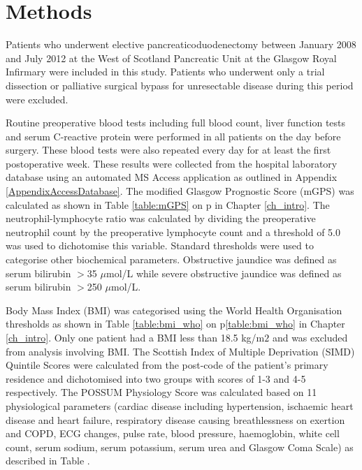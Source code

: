 

\section{Methods}
Patients who underwent elective pancreaticoduodenectomy between January 2008 and July 2012 at the West of Scotland Pancreatic Unit at the Glasgow Royal Infirmary were included in this study. 
Patients who underwent only a trial dissection or palliative surgical bypass for unresectable disease during this period were excluded.

Routine preoperative blood tests including full blood count, liver function tests and serum C-reactive protein were performed in all patients on the day before surgery. 
These blood tests were also repeated every day for at least the first postoperative week. 
These results were collected from the hospital laboratory database using an automated MS Access application as outlined in Appendix \ref{AppendixAccessDatabase}. 
The modified Glasgow Prognostic Score (mGPS) was calculated as shown in Table \ref{table:mGPS} on p\pageref{table:mGPS} in Chapter \ref{ch_intro}. 
The neutrophil-lymphocyte ratio was calculated by dividing the preoperative neutrophil count by the preoperative lymphocyte count and a threshold of 5.0 was used to dichotomise this variable. 
Standard thresholds were used to categorise other biochemical parameters. 
Obstructive jaundice was defined as serum bilirubin $>$35 $\mu$mol/L while severe obstructive jaundice was defined as serum bilirubin $>$250 $\mu$mol/L. 

Body Mass Index (BMI) was categorised using the World Health Organisation thresholds as shown in Table \ref{table:bmi_who} on p\ref{table:bmi_who} in Chapter \ref{ch_intro}. 
Only one patient had a BMI less than 18.5 kg/m$2$ and was excluded from analysis involving BMI.
The Scottish Index of Multiple Deprivation (SIMD) Quintile Scores were calculated from the post-code of the patient's primary residence and dichotomised into two groups with scores of 1-3 and 4-5 respectively.
The POSSUM Physiology Score was calculated based on 11 physiological parameters (cardiac disease including hypertension, ischaemic heart disease and heart failure, respiratory disease causing breathlessness on exertion and COPD, ECG changes, pulse rate, blood pressure, haemoglobin, white cell count, serum sodium, serum potassium, serum urea and Glasgow Coma Scale) as described in Table .


